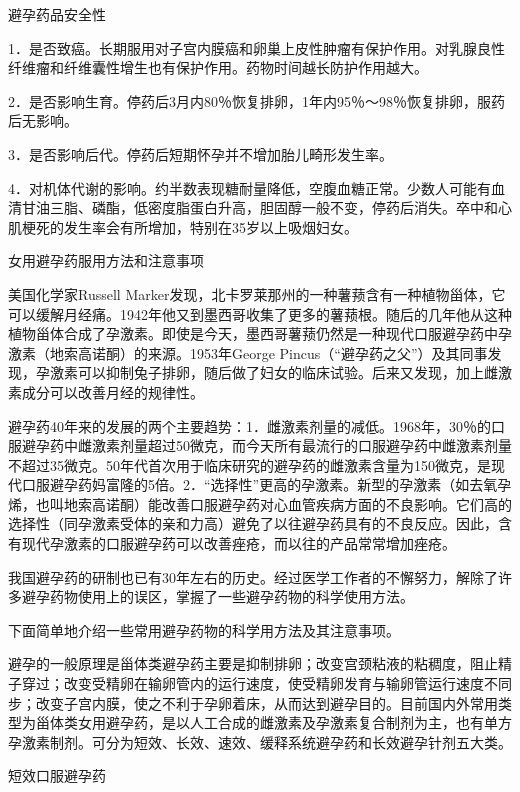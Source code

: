 \documentclass[12pt,UTF8,openany]{ctexbook}
\begin{document}
避孕药品安全性


1．是否致癌。长期服用对子宫内膜癌和卵巢上皮性肿瘤有保护作用。对乳腺良性纤维瘤和纤维囊性增生也有保护作用。药物时间越长防护作用越大。

2．是否影响生育。停药后3月内80％恢复排卵，1年内95％～98％恢复排卵，服药后无影响。

3．是否影响后代。停药后短期怀孕并不增加胎儿畸形发生率。

4．对机体代谢的影响。约半数表现糖耐量降低，空腹血糖正常。少数人可能有血清甘油三脂、磷酯，低密度脂蛋白升高，胆固醇一般不变，停药后消失。卒中和心肌梗死的发生率会有所增加，特别在35岁以上吸烟妇女。





女用避孕药服用方法和注意事项


美国化学家Russell Marker发现，北卡罗莱那州的一种薯蓣含有一种植物甾体，它可以缓解月经痛。1942年他又到墨西哥收集了更多的薯蓣根。随后的几年他从这种植物甾体合成了孕激素。即使是今天，墨西哥薯蓣仍然是一种现代口服避孕药中孕激素（地索高诺酮）的来源。1953年George Pincus（“避孕药之父”）及其同事发现，孕激素可以抑制兔子排卵，随后做了妇女的临床试验。后来又发现，加上雌激素成分可以改善月经的规律性。

避孕药40年来的发展的两个主要趋势：1．雌激素剂量的减低。1968年，30％的口服避孕药中雌激素剂量超过50微克，而今天所有最流行的口服避孕药中雌激素剂量不超过35微克。50年代首次用于临床研究的避孕药的雌激素含量为150微克，是现代口服避孕药妈富隆的5倍。2．“选择性”更高的孕激素。新型的孕激素（如去氧孕烯，也叫地索高诺酮）能改善口服避孕药对心血管疾病方面的不良影响。它们高的选择性（同孕激素受体的亲和力高）避免了以往避孕药具有的不良反应。因此，含有现代孕激素的口服避孕药可以改善痤疮，而以往的产品常常增加痤疮。

我国避孕药的研制也已有30年左右的历史。经过医学工作者的不懈努力，解除了许多避孕药物使用上的误区，掌握了一些避孕药物的科学使用方法。

下面简单地介绍一些常用避孕药物的科学用方法及其注意事项。

避孕的一般原理是甾体类避孕药主要是抑制排卵；改变宫颈粘液的粘稠度，阻止精子穿过；改变受精卵在输卵管内的运行速度，使受精卵发育与输卵管运行速度不同步；改变子宫内膜，使之不利于孕卵着床，从而达到避孕目的。目前国内外常用类型为甾体类女用避孕药，是以人工合成的雌激素及孕激素复合制剂为主，也有单方孕激素制剂。可分为短效、长效、速效、缓释系统避孕药和长效避孕针剂五大类。





短效口服避孕药
\end{document}
